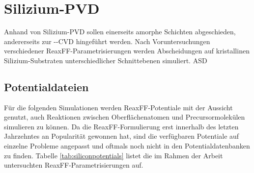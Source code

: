 \section{Silizium-PVD}
\label{siliconpvd}

Anhand von Silizium-PVD sollen einerseits amorphe Schichten abgeschieden, andererseits zur --CVD hingeführt werden.
Nach Voruntersuchungen verschiedener ReaxFF-Para\-metrisierungen werden Abscheidungen auf kristallinen Silizium-Substraten unterschiedlicher Schnittebenen simuliert.
ASD

\subsection{Potentialdateien}

Für die folgenden Simulationen werden ReaxFF-Potentiale mit der Aussicht genutzt, auch Reaktionen zwischen Oberflächenatomen und Precursormolekülen simulieren zu können.
Da die ReaxFF-Formulierung erst innerhalb des letzten Jahrzehntes an Popularität gewonnen hat, sind die verfügbaren Potentiale auf einzelne Probleme angepasst und oftmals noch nicht in den Potentialdatenbanken zu finden.
Tabelle \ref{tab:siliconpotentials} listet die im Rahmen der Arbeit untersuchten ReaxFF-Parametrisierungen auf.

